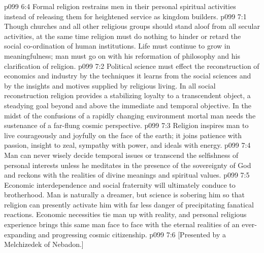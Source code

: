 \vs p099 6:4 Formal religion restrains men in their personal spiritual activities instead of releasing them for heightened service as kingdom builders.
\vs p099 7:1 Though churches and all other religious groups should stand aloof from all secular activities, at the same time religion must do nothing to hinder or retard the social co\hyp{}ordination of human institutions. Life must continue to grow in meaningfulness; man must go on with his reformation of philosophy and his clarification of religion.
\vs p099 7:2 Political science must effect the reconstruction of economics and industry by the techniques it learns from the social sciences and by the insights and motives supplied by religious living. In all social reconstruction religion provides a stabilizing loyalty to a transcendent object, a steadying goal beyond and above the immediate and temporal objective. In the midst of the confusions of a rapidly changing environment mortal man needs the sustenance of a far\hyp{}flung cosmic perspective.
\vs p099 7:3 Religion inspires man to live courageously and joyfully on the face of the earth; it joins patience with passion, insight to zeal, sympathy with power, and ideals with energy.
\vs p099 7:4 Man can never wisely decide temporal issues or transcend the selfishness of personal interests unless he meditates in the presence of the sovereignty of God and reckons with the realities of divine meanings and spiritual values.
\vs p099 7:5 Economic interdependence and social fraternity will ultimately conduce to brotherhood. Man is naturally a dreamer, but science is sobering him so that religion can presently activate him with far less danger of precipitating fanatical reactions. Economic necessities tie man up with reality, and personal religious experience brings this same man face to face with the eternal realities of an ever\hyp{}expanding and progressing cosmic citizenship.
\vsetoff
\vs p099 7:6 [Presented by a Melchizedek of Nebadon.]
